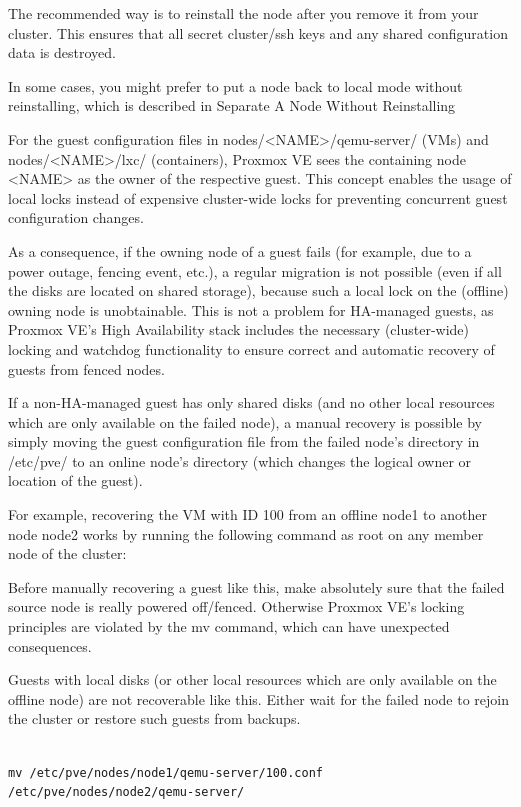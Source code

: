 The recommended way is to reinstall the node after you remove it from your cluster. This ensures that all secret cluster/ssh keys and any shared configuration data is destroyed.

In some cases, you might prefer to put a node back to local mode without reinstalling, which is described in Separate A Node Without Reinstalling

For the guest configuration files in nodes/<NAME>/qemu-server/ (VMs) and nodes/<NAME>/lxc/ (containers), Proxmox VE sees the containing node <NAME> as the owner of the respective guest. This concept enables the usage of local locks instead of expensive cluster-wide locks for preventing concurrent guest configuration changes.

As a consequence, if the owning node of a guest fails (for example, due to a power outage, fencing event, etc.), a regular migration is not possible (even if all the disks are located on shared storage), because such a local lock on the (offline) owning node is unobtainable. This is not a problem for HA-managed guests, as Proxmox VE’s High Availability stack includes the necessary (cluster-wide) locking and watchdog functionality to ensure correct and automatic recovery of guests from fenced nodes.

If a non-HA-managed guest has only shared disks (and no other local resources which are only available on the failed node), a manual recovery is possible by simply moving the guest configuration file from the failed node’s directory in /etc/pve/ to an online node’s directory (which changes the logical owner or location of the guest).

For example, recovering the VM with ID 100 from an offline node1 to another node node2 works by running the following command as root on any member node of the cluster:

Before manually recovering a guest like this, make absolutely sure that the failed source node is really powered off/fenced. Otherwise Proxmox VE’s locking principles are violated by the mv command, which can have unexpected consequences.

Guests with local disks (or other local resources which are only available on the offline node) are not recoverable like this. Either wait for the failed node to rejoin the cluster or restore such guests from backups.

\begin{lstlisting}

mv /etc/pve/nodes/node1/qemu-server/100.conf /etc/pve/nodes/node2/qemu-server/

\end{lstlisting}


